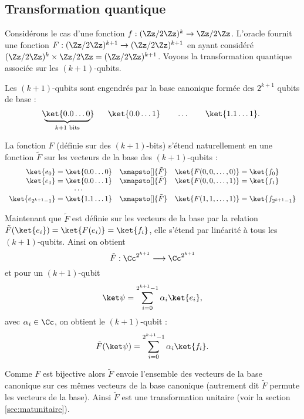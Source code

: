 \documentclass[11pt,class=report,crop=false]{standalone}
\begin{document}
\subsection{Transformation quantique}

Considérons le cas d'une fonction $f : (\Zz/2\Zz)^k \to \Zz/2\Zz$. 
L'oracle fournit une fonction $F : (\Zz/2\Zz)^{k+1}  \to (\Zz/2\Zz)^{k+1}$ en ayant considéré $(\Zz/2\Zz)^k \times \Zz/2\Zz = (\Zz/2\Zz)^{k+1}$.
Voyons la transformation quantique associée sur les $(k+1)$-qubits.

Les $(k+1)$-qubits sont engendrés par la base canonique formée des $2^{k+1}$ qubits de base :
$$\underbrace{\!\!\ket{0.0 \ldots 0}\!\!\!}_{k+1 \text{ bits}} \qquad \ket{0.0 \ldots 1} \qquad \ldots \qquad \ket{1.1 \ldots 1}.$$

La fonction $F$ (définie sur des $(k+1)$-bits) s'étend naturellement en une fonction $\tilde F$ sur les vecteurs de la base des $(k+1)$-qubits :
$$\begin{array}{rcl}
\ket{e_0} = \ket{0.0 \ldots 0} &\xmapsto[]{\tilde F}& \ket{F(0,0,\ldots,0)} = \ket{f_0} \\
\ket{e_1} = \ket{0.0 \ldots 1} &\xmapsto[]{\tilde F}& \ket{F(0,0,\ldots,1)} = \ket{f_1} \\
\cdots \qquad\qquad && \\
\ket{e_{2^{k+1}-1}} = \ket{1.1 \ldots 1} &\xmapsto[]{\tilde F}& \ket{F(1,1,\ldots,1)} = \ket{f_{2^{k+1}-1}} \\
\end{array}$$

Maintenant que $\tilde F$ est définie sur les vecteurs de la base par la relation $\tilde F(\ket{e_i}) = \ket{F(e_i)} = \ket{f_i}$, elle s'étend par linéarité à tous les $(k+1)$-qubits. Ainsi on obtient 
$$\tilde F : \Cc^{2^{k+1}} \longrightarrow \Cc^{2^{k+1}}$$
et pour un $(k+1)$-qubit 
$$\ket\psi = \sum_{i=0}^{2^{k+1}-1} \alpha_i \ket{e_i},$$
avec $\alpha_i \in \Cc$, 
on obtient le $(k+1)$-qubit :
$$\tilde F(\ket\psi) = \sum_{i=0}^{2^{k+1}-1} \alpha_i \ket{f_i}.$$

Comme $F$ est bijective alors $\tilde F$ envoie l'ensemble des vecteurs de la base canonique sur ces mêmes vecteurs de la base canonique (autrement dit $\tilde F$ permute les vecteurs de la base). Ainsi $\tilde F$ est une transformation unitaire (voir la section \ref{sec:matunitaire}).
\end{document}
